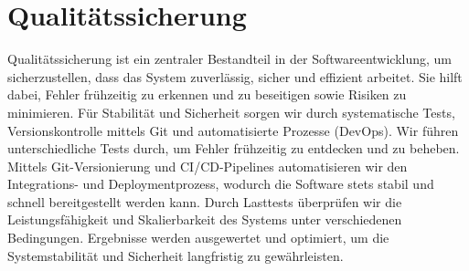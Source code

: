 \section*{Qualitätssicherung}

Qualitätssicherung ist ein zentraler Bestandteil in der Softwareentwicklung, um sicherzustellen, dass das System zuverlässig, sicher und effizient arbeitet. Sie hilft dabei, Fehler frühzeitig zu erkennen und zu beseitigen sowie Risiken zu minimieren.
Für Stabilität und Sicherheit sorgen wir durch systematische Tests, Versionskontrolle mittels Git und automatisierte Prozesse (DevOps). 
Wir führen unterschiedliche Tests durch, um Fehler frühzeitig zu entdecken und zu beheben.
Mittels Git-Versionierung und CI/CD-Pipelines automatisieren wir den Integrations- und Deploymentprozess, wodurch die Software stets stabil und schnell bereitgestellt werden kann. Durch Lasttests überprüfen wir die Leistungsfähigkeit und Skalierbarkeit des Systems unter verschiedenen Bedingungen. Ergebnisse werden ausgewertet und optimiert, um die Systemstabilität und Sicherheit langfristig zu gewährleisten.

